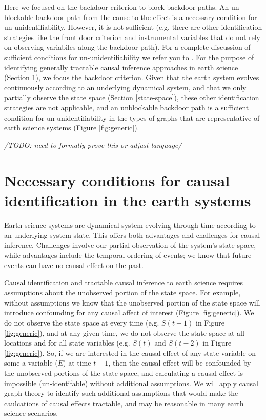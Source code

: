 \documentclass[12pt]{article}
\begin{document}
Here we focused on the backdoor criterion to block backdoor paths. An
un-blockable backdoor path from the cause to the effect is a necessary
condition for un-unidentifiability. However, it is not sufficient
(e.g. there are other identification strategies like the front door
criterion and instrumental variables that do not rely on observing
variabiles along the backdoor path). For a complete discussion of
sufficient conditions for un-unidentifiability we refer you to
\citet{shpitser2006}. For the purpose of identifying generally
tractable causal inference approaches in earth science (Section
\ref{sec:necess-cond-caus}), we focus the backdoor criterion. Given
that the earth system evolves continuously according to an underlying
dynamical system, and that we only partially observe the state space
(Section \ref{state-space}), these other identification strategies are
not applicable, and an unblockable backdoor path is a sufficient
condition for un-unidentifiability in the types of graphs that are
representative of earth science systems (Figure \ref{fig:generic}).

\textit{/TODO: need to formally prove this or adjust language/}

\section{Necessary conditions for causal identification in the earth
  systems}
\label{sec:necess-cond-caus}

Earth science systems are dynamical system evolving through time
according to an underlying system state. This offers both advantages
and challenges for causal inference. Challenges involve our partial
observation of the system's state space, while advantages include the
temporal ordering of events; we know that future events can have no
causal effect on the past.

Causal identification and tractable causal inference to earth science
requires assumptions about the unobserved portion of the state
space. For example, without assumptions we know that the unobserved
portion of the state space will introduce confounding for any causal
affect of interest (Figure \ref{fig:generic}). We do not observe the
state space at every time (e.g. $S(t-1)$ in Figure \ref{fig:generic}),
and at any given time, we do not observe the state space at all
locations and for all state variables (e.g. $S(t)$ and $S(t-2)$ in
Figure \ref{fig:generic}). So, if we are interested in the causal
effect of any state variable on some a variable ($E$) at time $t+1$,
then the causal effect will be confounded by the unobserved portions
of the state space, and calculating a causal effect is impossible
(un-identifable) without additional assumptions. We will apply causal
graph theory to identify such additional assumptions that would make
the caulcations of causal effects tractable, and may be reasonable in
many earth science scenarios.
\end{document}

